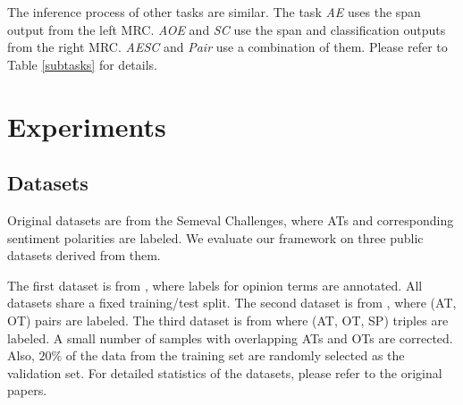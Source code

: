 \documentclass[letterpaper]{article} \usepackage{aaai21}  \usepackage{times}  \usepackage{helvet} \usepackage{courier}  \usepackage[hyphens]{url}  \usepackage{graphicx} \urlstyle{rm} \def\UrlFont{\rm}  \usepackage{natbib}  \usepackage{caption}
\begin{document}
The inference process of other tasks are similar. The task \emph{AE} uses the span output from the left MRC. 
\emph{AOE} and \emph{SC} use the span and classification outputs from the right MRC. 
\emph{AESC} and \emph{Pair} use a combination of them. 
Please refer to Table \ref{subtasks} for details.


\section{Experiments}
\subsection{Datasets}
Original datasets are from the Semeval Challenges\cite{pontiki-etal-2014-semeval, pontiki-etal-2015-semeval, pontiki-etal-2016-semeval}, where ATs and corresponding sentiment polarities are labeled. 
We evaluate our framework on three public datasets derived from them.


The first dataset is from \cite{DBLP:conf/aaai/WangPDX17}, where labels for opinion terms are annotated. All datasets share a fixed training/test split. 
 The second dataset is from \cite{fan2019target}, where (AT, OT) pairs are labeled. 
The third dataset is from \cite{peng2020knowing} where (AT, OT, SP) triples are labeled. 
A small number of samples with overlapping ATs and OTs are corrected. 
Also, $20\%$ of the data from the training set are randomly selected as the validation set. 
For detailed statistics of the datasets, please refer to the original papers.
\end{document}
